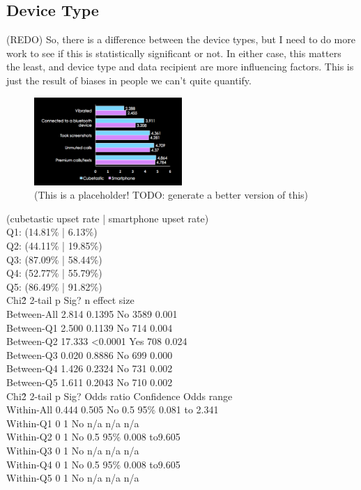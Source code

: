 \documentclass{acm_proc_article-sp}
\begin{document}
\subsection{Device Type}

(REDO) So, there is a difference between the device types, but I need to do more work to see if this is statistically significant or not. In either case, this matters the least, and device type and data recipient are more influencing factors. This is just the result of biases in people we can't quite quantify.  

\begin{figure}
	\centering
	\includegraphics[width=0.5\textwidth]{device-type.png}
	\caption{(This is a placeholder! TODO: generate a better version of this)}
\end{figure}

  (cubetastic upset rate | smartphone upset rate)\\
Q1: (14.81\% | 6.13\%)\\
Q2: (44.11\% | 19.85\%)\\
Q3: (87.09\% | 58.44\%)\\
Q4: (52.77\% | 55.79\%)\\
Q5: (86.49\% | 91.82\%)\\ 

			Chi\^2	2-tail p	Sig?		n		effect size\\
Between-All	2.814	0.1395	No		3589		0.001\\
Between-Q1	2.500	0.1139	No		714		0.004\\
Between-Q2	17.333	<0.0001	Yes		708		0.024\\
Between-Q3	0.020	0.8886	No		699		0.000\\
Between-Q4	1.426	0.2324	No		731		0.002\\
Between-Q5	1.611		0.2043	No		710		0.002\\
						
			Chi\^2	2-tail p	Sig?	Odds ratio	Confidence	Odds range\\
Within-All		0.444	0.505	No	0.5		95\%			0.081 to 2.341\\
Within-Q1		0		1		No	n/a	         n/a	                  n/a\\
Within-Q2		0		1		No	0.5		95\%	                  0.008 to9.605\\
Within-Q3		0		1		No	n/a	         n/a	                  n/a\\
Within-Q4		0		1		No	0.5		95\%			0.008 to9.605\\
Within-Q5		0		1		No	n/a	         n/a	                  n/a\\
\end{document}
